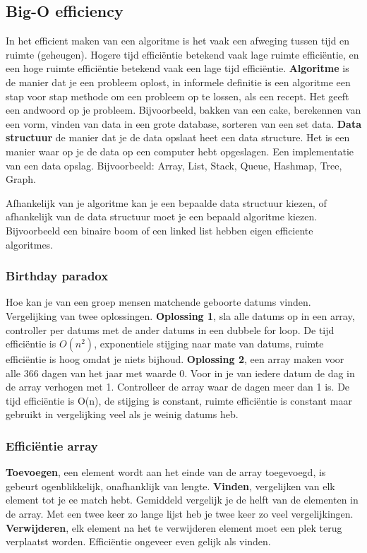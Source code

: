 \subsection{Big-O efficiency}
In het efficient maken van een algoritme is het vaak een afweging tussen tijd en ruimte (geheugen).
Hogere tijd efficiëntie betekend vaak lage ruimte efficiëntie, en een hoge ruimte efficiëntie betekend vaak een lage tijd efficiëntie.
\textbf{Algoritme} is de manier dat je een probleem oplost, in informele definitie is een algoritme een stap voor stap methode om een probleem op te lossen, als een recept. Het geeft een andwoord op je probleem. Bijvoorbeeld, bakken van een cake, berekennen van een vorm, vinden van data in een grote database, sorteren van een set data.
\textbf{Data structuur} de manier dat je de data opslaat heet een data structure. Het is een manier waar op je de data op een computer hebt opgeslagen.
Een implementatie van een data opslag.
Bijvoorbeeld: Array, List, Stack, Queue, Hashmap, Tree, Graph.

Afhankelijk van je algoritme kan je een bepaalde data structuur kiezen, of afhankelijk van de data structuur moet je een bepaald algoritme kiezen.
Bijvoorbeeld een binaire boom of een linked list hebben eigen efficiente algoritmes.

\subsubsection{Birthday paradox}
Hoe kan je van een groep mensen matchende geboorte datums vinden.
Vergelijking van twee oplossingen.
\textbf{Oplossing 1}, sla alle datums op in een array, controller per datums met de ander datums in een dubbele for loop.
De tijd efficiëntie is $O(n^2)$, exponentiele stijging naar mate van datums, ruimte efficiëntie is hoog omdat je niets bijhoud.
\textbf{Oplossing 2}, een array maken voor alle 366 dagen van het jaar met waarde 0.
Voor in je van iedere datum de dag in de array verhogen met 1.
Controlleer de array waar de dagen meer dan 1 is.
De tijd efficiëntie is O(n), de stijging is constant, ruimte efficiëntie is constant maar gebruikt in vergelijking veel als je weinig datums heb.

\subsubsection{Efficiëntie array}
\textbf{Toevoegen}, een element wordt aan het einde van de array toegevoegd, is gebeurt ogenblikkelijk, onafhanklijk van lengte.
\textbf{Vinden}, vergelijken van elk element tot je ee match hebt.
Gemiddeld vergelijk je de helft van de elementen in de array.
Met een twee keer zo lange lijst heb je twee keer zo veel vergelijkingen.
\textbf{Verwijderen}, elk element na het te verwijderen element moet een plek terug verplaatst worden.
Efficiëntie ongeveer even gelijk als vinden.

